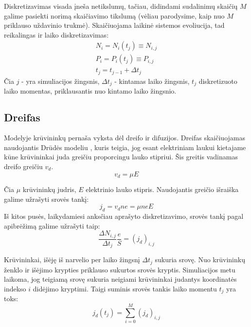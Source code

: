 Diskretizavimas visada įneša netikslumų, tačiau, didindami sudalinimų skaičių \(M\) galime pasiekti norimą skaičiavimo tikslumą (vėliau parodysime, kaip nuo \(M\) priklauso uždavinio trukmė).
Skaičiuojama laikinė sistemos evoliucija, tad reikalingas ir laiko diskretizavimas:
\begin{equation}
\begin{array}{c}
N_i = N_i(t_j) \equiv N_{i,j}\\
P_i = P_i(t_j) \equiv P_{i,j}\\
t_j = t_{j-1} + \Delta t_j
\end{array}
\end{equation}
Čia \(j\) - yra simuliacijos žingsnis, \(\Delta t_j\) - kintamas laiko žingsnis, \(t_j\) diskretizuoto laiko momentas, priklausantis nuo kintamo laiko žingsnio.

\subsection{Dreifas}

Modelyje krūvininkų pernaša vyksta dėl dreifo ir difuzijos. Dreifas skaičiuojamas naudojantis Drūdės modeliu \cite{ashcroft}, kuris teigia, jog esant elektriniam laukui kietajame kūne krūvininkai juda greičiu proporcingu lauko stipriui. Šis greitis vadinamas dreifo greičiu $v_d$.
\begin{equation}
	v_d= \mu E
\end{equation}
	
Čia \(\mu\) krūvininkų judris, \(E\) elektrinio lauko stipris.
Naudojantis greičio išraiška galime užrašyti srovės tankį:
\begin{equation} \label{eq:tankis}
	j_d = v_d n e = \mu n e E
\end{equation}
Iš kitos pusės, laikydamiesi anksčiau aprašyto diskretizavimo, srovės tankį pagal apibrėžimą galime užrašyti taip:
\begin{equation} \label{eq:pokytis}
\frac{\Delta N_{i,j}}{\Delta t_j} \frac{e}{S}=(j_d)_{i,j}
\end{equation}
	
Krūvininkai, išėję iš narvelio per laiko žingsnį \(\Delta t_j\) sukuria srovę. Nuo krūvininkų ženklo ir išėjimo krypties priklauso sukurtos srovės kryptis. Simuliacijos metu laikoma, jog teigiamą srovę sukuria neigiami krūvininkai judantys koordinatės indekso $i$ didėjimo kryptimi.
Taigi suminis srovės tankis laiko momentu \(t_j\) yra toks:
\begin{equation}
j_d(t_j)= \sum_{i=0}^{M} (j_d)_{i,j}
\end{equation}
	

